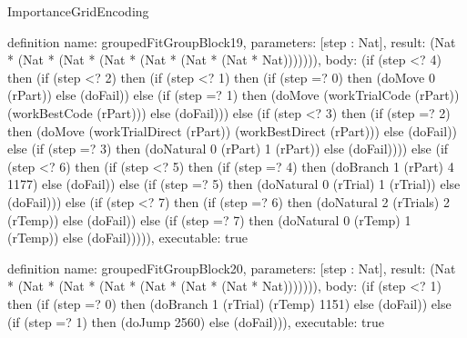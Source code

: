 \begin{lexlean}{ImportanceGridEncoding}
\begin{semanticmodule}
definition{
  name: groupedFitGroupBlock19,
  parameters: [step : Nat],
  result: (Nat * (Nat * (Nat * (Nat * (Nat * (Nat * (Nat * Nat))))))),
  body: (if (step <? 4) then
      (if (step <? 2) then
      (if (step <? 1) then
      (if (step =? 0) then (doMove 0 (rPart)) else (doFail)) else
      (if (step =? 1) then (doMove (workTrialCode (rPart)) (workBestCode (rPart))) else (doFail))) else
      (if (step <? 3) then
      (if (step =? 2) then (doMove (workTrialDirect (rPart)) (workBestDirect (rPart))) else (doFail)) else
      (if (step =? 3) then (doNatural 0 (rPart) 1 (rPart)) else (doFail)))) else
      (if (step <? 6) then
      (if (step <? 5) then
      (if (step =? 4) then (doBranch 1 (rPart) 4 1177) else (doFail)) else
      (if (step =? 5) then (doNatural 0 (rTrial) 1 (rTrial)) else (doFail))) else
      (if (step <? 7) then
      (if (step =? 6) then (doNatural 2 (rTrials) 2 (rTemp)) else (doFail)) else
      (if (step =? 7) then (doNatural 0 (rTemp) 1 (rTemp)) else (doFail))))),
  executable: true
}

definition{
  name: groupedFitGroupBlock20,
  parameters: [step : Nat],
  result: (Nat * (Nat * (Nat * (Nat * (Nat * (Nat * (Nat * Nat))))))),
  body: (if (step <? 1) then
      (if (step =? 0) then (doBranch 1 (rTrial) (rTemp) 1151) else (doFail)) else
      (if (step =? 1) then (doJump 2560) else (doFail))),
  executable: true
}


\end{semanticmodule}
\end{lexlean}
